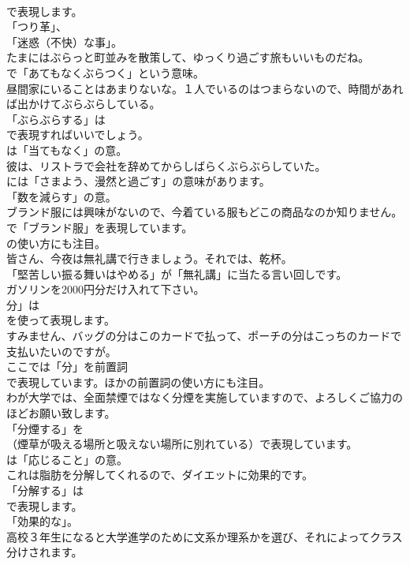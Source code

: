 \documentclass[8pt]{extreport}
\begin{document}
\begin{CJK}{UTF8}{min}
\\	で表現します。
\\	「つり革」、
\\	「迷惑（不快）な事」。	
\\	たまにはぶらっと町並みを散策して、ゆっくり過ごす旅もいいものだね。 
\\	で「あてもなくぶらつく」という意味。	
\\	昼間家にいることはあまりないな。１人でいるのはつまらないので、時間があれば出かけてぶらぶらしている。 
\\	「ぶらぶらする」は 
\\	で表現すればいいでしょう。
\\	は「当てもなく」の意。	
\\	彼は、リストラで会社を辞めてからしばらくぶらぶらしていた。 
\\	には「さまよう、漫然と過ごす」の意味があります。
\\	「数を減らす」の意。	
\\	ブランド服には興味がないので、今着ている服もどこの商品なのか知りません。 
\\	で「ブランド服」を表現しています。
\\	の使い方にも注目。	
\\	皆さん、今夜は無礼講で行きましょう。それでは、乾杯。 
\\	「堅苦しい振る舞いはやめる」が「無礼講」に当たる言い回しです。	
\\	ガソリンを2000円分だけ入れて下さい。 
\\	分」は
\\	を使って表現します。	
\\	すみません、バッグの分はこのカードで払って、ポーチの分はこっちのカードで支払いたいのですが。 
\\	ここでは「分」を前置詞 
\\	で表現しています。ほかの前置詞の使い方にも注目。	
\\	わが大学では、全面禁煙ではなく分煙を実施していますので、よろしくご協力のほどお願い致します。 
\\	「分煙する」を 
\\	（煙草が吸える場所と吸えない場所に別れている）で表現しています。
\\	は「応じること」の意。	
\\	これは脂肪を分解してくれるので、ダイエットに効果的です。 
\\	「分解する」は
\\	で表現します。
\\	「効果的な」。	
\\	高校３年生になると大学進学のために文系か理系かを選び、それによってクラス分けされます。 

\end{CJK}
\end{document}
